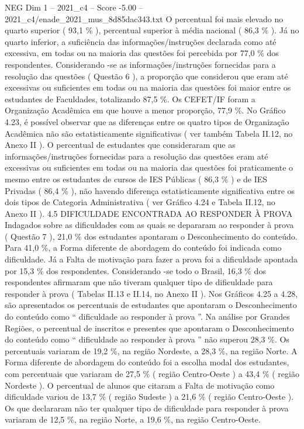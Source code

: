 \begin{textsample}{NEG Dim 1 – 2021\_c4 – Score -5.00 – 2021\_c4/enade\_2021\_mus\_8d85dac343.txt}
O percentual foi mais elevado no quarto superior ( 93,1 \% ), percentual superior à média nacional ( 86,3 \% ).
Já no quarto inferior, a suficiência das informações/instruções declarada como até excessiva, em todas ou na maioria das questões foi percebida por 77,0 \% dos respondentes.
Considerando -se as informações/instruções fornecidas para a resolução das questões ( Questão 6 ), a proporção que considerou que eram até excessivas ou suficientes em todas ou na maioria das questões foi maior entre os estudantes de Faculdades, totalizando 87,5 \%.
Os CEFET/IF foram a Organização Acadêmica em que houve a menor proporção, 77,9 \%.
No Gráfico 4.23, é possível observar que as diferenças entre os quatro tipos de Organização Acadêmica não são estatisticamente significativas ( ver também Tabela II.12, no Anexo II ).
O percentual de estudantes que consideraram que as informações/instruções fornecidas para a resolução das questões eram até excessivas ou suficientes em todas ou na maioria das questões foi praticamente o mesmo entre os estudantes de cursos de IES Públicas ( 86,3 \% ) e de IES Privadas ( 86,4 \% ), não havendo diferença estatisticamente significativa entre os dois tipos de Categoria Administrativa ( ver Gráfico 4.24 e Tabela II.12, no Anexo II ). 4.5 DIFICULDADE ENCONTRADA AO RESPONDER À PROVA Indagados sobre as dificuldades com as quais se depararam ao responder à prova ( Questão 7 ), 21,0 \% dos estudantes apontaram o Desconhecimento do conteúdo.
Para 41,0 \%, a Forma diferente de abordagem do conteúdo foi indicada como dificuldade.
Já a Falta de motivação para fazer a prova foi a dificuldade apontada por 15,3 \% dos respondentes.
Considerando -se todo o Brasil, 16,3 \% dos respondentes afirmaram que não tiveram qualquer tipo de dificuldade para responder à prova ( Tabelas II.13 e II.14, no Anexo II ).
Nos Gráficos 4.25 a 4.28, são apresentados os percentuais de estudantes que apontaram o Desconhecimento do conteúdo como “ dificuldade ao responder à prova ”.
Na análise por Grandes Regiões, o percentual de inscritos e presentes que apontaram o Desconhecimento do conteúdo como “ dificuldade ao responder à prova ” não superou 28,3 \%.
Os percentuais variaram de 19,2 \%, na região Nordeste, a 28,3 \%, na região Norte.
A Forma diferente de abordagem do conteúdo foi a escolha modal dos estudantes, com percentuais que variaram de 27,5 \% ( região Centro-Oeste ) a 43,4 \% ( região Nordeste ).
O percentual de alunos que citaram a Falta de motivação como dificuldade variou de 13,7 \% ( região Sudeste ) a 21,6 \% ( região Centro-Oeste ).
Os que declararam não ter qualquer tipo de dificuldade para responder à prova variaram de 12,5 \%, na região Norte, a 19,6 \%, na região Centro-Oeste.

\end{textsample}
